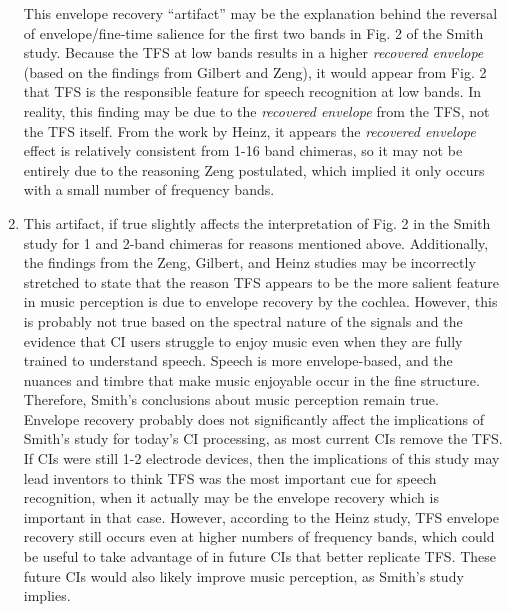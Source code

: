 \documentclass[9pt]{extarticle}
\begin{document}
\begin{enumerate}[label = \alph*)]
This envelope recovery ``artifact'' may be the explanation behind the reversal of envelope/fine-time salience for the first two bands in Fig. 2 of the Smith study. Because the TFS at low bands results in a higher \textit{recovered envelope} (based on the findings from Gilbert and Zeng), it would appear from Fig. 2 that TFS is the responsible feature for speech recognition at low bands. In reality, this finding may be due to the \textit{recovered envelope} from the TFS, not the TFS itself. From the work by Heinz, it appears the \textit{recovered envelope} effect is relatively consistent from 1-16 band chimeras, so it may not be entirely due to the reasoning Zeng postulated, which implied it only occurs with a small number of frequency bands.

\item This artifact, if true slightly affects the interpretation of Fig. 2 in the Smith study for 1 and 2-band chimeras for reasons mentioned above. Additionally, the findings from the Zeng, Gilbert, and Heinz studies may be incorrectly stretched to state that the reason TFS appears to be the more salient feature in music perception is due to envelope recovery by the cochlea. However, this is probably not true based on the spectral nature of the signals and the evidence that CI users struggle to enjoy music even when they are fully trained to understand speech. Speech is more envelope-based, and the nuances and timbre that make music enjoyable occur in the fine structure. Therefore, Smith's conclusions about music perception remain true. \\

Envelope recovery probably does not significantly affect the implications of Smith's study for today's CI processing, as most current CIs remove the TFS. If CIs were still 1-2 electrode devices, then the implications of this study may lead inventors to think TFS was the most important cue for speech recognition, when it actually may be the envelope recovery which is important in that case. However, according to the Heinz study, TFS envelope recovery still occurs even at higher numbers of frequency bands, which could be useful to take advantage of in future CIs that better replicate TFS. These future CIs would also likely improve music perception, as Smith's study implies.  
  

\end{enumerate}
\end{document}

